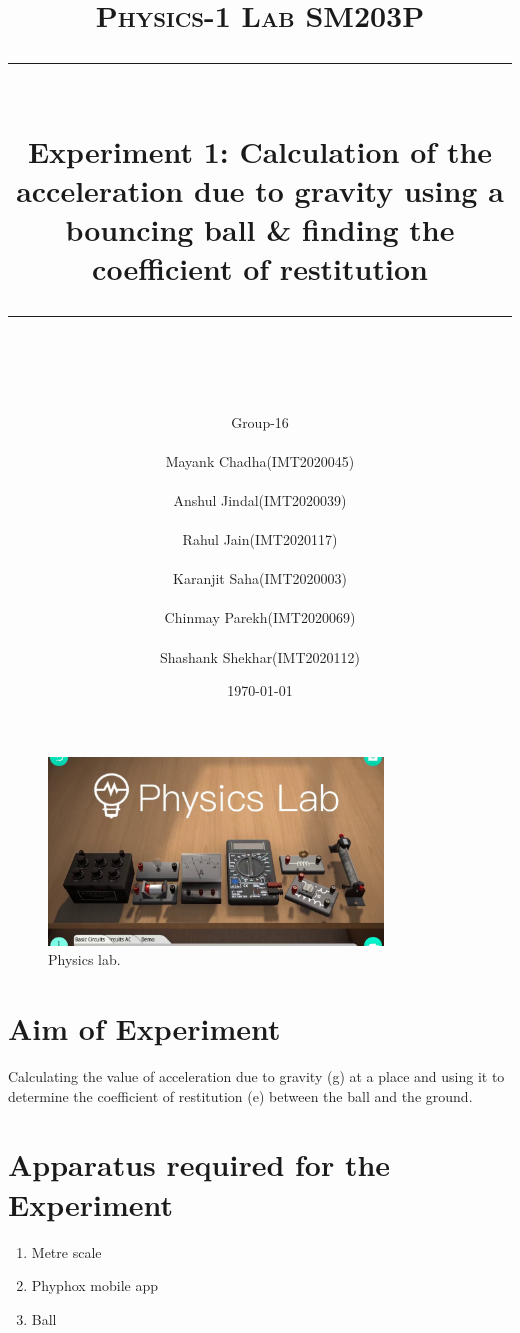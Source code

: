 \documentclass[11pt]{scrartcl} %
\title{	
	\normalfont\normalsize
	\textsc{\Huge Physics-1 Lab SM203P}\\ %
	\vspace{25pt} %
	\rule{\linewidth}{0.5pt}\\ %
	\vspace{20pt} %
	{\huge Experiment 1: Calculation of the acceleration due to gravity using a
bouncing ball & finding the coefficient of restitution}\\ %
	\vspace{12pt} %
	\rule{\linewidth}{2pt}\\ %
	\vspace{12pt} %
}
\author{\Huge Group-16\\
\\
\LARGE Mayank Chadha(IMT2020045)\\
\\
\LARGE Anshul Jindal(IMT2020039)\\
\\
\LARGE Rahul Jain(IMT2020117)\\
\\
\LARGE Karanjit Saha(IMT2020003)\\
\\
\LARGE Chinmay Parekh(IMT2020069)\\
\\
\LARGE Shashank Shekhar(IMT2020112)} %
\date{\normalsize\today} %
\begin{document}
\maketitle %

\begin{figure}[h] %
	\centering
	\includegraphics[width=\textwidth, height=5cm]{first.jpg} %
	\caption{Physics lab.}
\end{figure}

\section{Aim of Experiment}
Calculating the value of acceleration due to gravity (g) at a place and using it to determine the coefficient of restitution (e) between the ball and the ground. \par

\section{Apparatus required for the Experiment}
\begin{enumerate}
	\item Metre scale 
	\item Phyphox mobile app
	\item Ball 
\end{enumerate}





\end{document}
